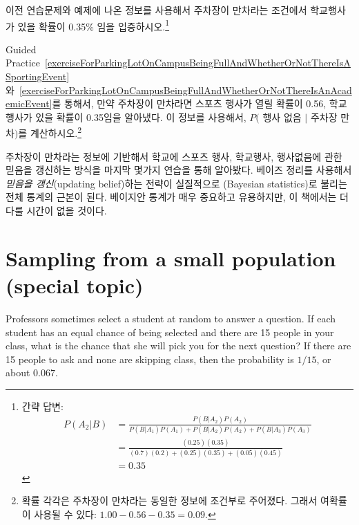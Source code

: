 \begin{exercise} \label{exerciseForParkingLotOnCampusBeingFullAndWhetherOrNotThereIsAnAcademicEvent}
이전 연습문제와 예제에 나온 정보를 사용해서 주차장이 만차라는 조건에서 학교행사가 있을 확률이 0.35\% 임을 입증하시오.\footnote{간략 답변:
\begin{align*}
P(A_2 | B) &= \frac{P(B | A_2) P(A_2)}{P(B | A_1) P(A_1) + P(B | A_2) P(A_2) + P(B | A_3) P(A_3)} \\
		&= \frac{(0.25)(0.35)}{(0.7)(0.2) + (0.25)(0.35) + (0.05)(0.45)} \\
		&= 0.35
\end{align*}}
\end{exercise}

\begin{exercise} \label{exerciseForParkingLotOnCampusBeingFullAndWhetherOrNotThereIsNoEvent}
Guided Practice~\ref{exerciseForParkingLotOnCampusBeingFullAndWhetherOrNotThereIsASportingEvent} 와~\ref{exerciseForParkingLotOnCampusBeingFullAndWhetherOrNotThereIsAnAcademicEvent}를 통해서, 만약 주차장이 만차라면 스포츠 행사가 열릴 확률이 0.56, 학교행사가 있을 확률이 0.35임을 알아냈다. 이 정보를 사용해서, $P($ 행사 없음 $|$ 주차장 만차$)$를 계산하시오.\footnote{
확률 각각은 주차장이 만차라는 동일한 정보에 조건부로 주어졌다. 그래서 여확률이 사용될 수 있다: $1.00 - 0.56 - 0.35 = 0.09$.}
\end{exercise}

주차장이 만차라는 정보에 기반해서 학교에 스포츠 행사, 학교행사, 행사없음에 관한 믿음을 갱신하는 방식을 마지막 몇가지 연습을 통해 알아봤다. 베이즈 정리를 사용해서 \emph{믿음을 갱신}(updating belief)하는 전략이 실질적으로 (Bayesian statistics)로 불리는 전체 통계의 근본이 된다. 베이지안 통계가 매우 중요하고 유용하지만, 이 책에서는 더 다룰 시간이 없을 것이다.




\section{Sampling from a small population (special topic)}
\label{smallPop}

\begin{example}{Professors sometimes select a student at random to answer a question. If each student has an equal chance of being selected and there are 15 people in your class, what is the chance that she will pick you for the next question?}
If there are 15 people to ask and none are skipping class, then the probability is $1/15$, or about $0.067$.
\end{example}

